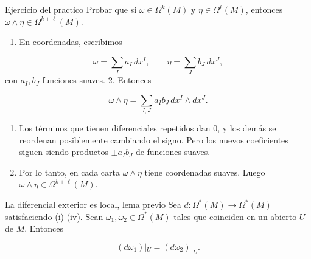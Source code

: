 \begin{bookproposition}{Ejercicio del practico}
Probar que si $\omega\in\Omega^k(M)$ y $\eta\in\Omega^\ell(M)$, entonces $\omega\wedge\eta\in\Omega^{k+\ell}(M)$.

\end{bookproposition}
\begin{bookproof}{}
\begin{enumerate}
\item En coordenadas, escribimos
\end{enumerate}
\[
\omega=\sum_I a_I\,dx^I,\qquad \eta=\sum_J b_J\,dx^J,
\]
con $a_I,b_J$ funciones suaves. 2. Entonces

\[
\omega\wedge\eta=\sum_{I,J}a_Ib_J\,dx^I\wedge dx^J.
\]
\begin{enumerate}[start=3]
\item Los términos que tienen diferenciales repetidos dan $0$, y los demás se reordenan posiblemente cambiando el signo. Pero los nuevos coeficientes siguen siendo productos $\pm a_Ib_J$ de funciones suaves.
\item Por lo tanto, en cada carta $\omega\wedge\eta$ tiene coordenadas suaves. Luego $\omega\wedge\eta\in\Omega^{k+\ell}(M)$.
\end{enumerate}
\bookqed
\end{bookproof}
\begin{booklemma}{La diferencial exterior es local, lema previo}
Sea $d:\Omega^*(M)\to\Omega^*(M)$ satisfaciendo (i)-(iv). Sean $\omega_1,\omega_2\in\Omega^*(M)$ tales que coinciden en un abierto $U$ de $M$. Entonces

\[
(d\omega_1)|_U=(d\omega_2)|_U.
\]
\end{booklemma}
